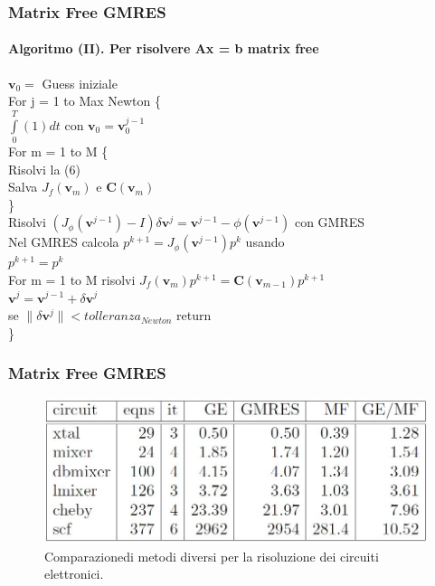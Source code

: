 \documentclass[10pt]{beamer}
\begin{document}
\begin{frame}
\frametitle{Matrix Free GMRES}\framesubtitle{\textbf{Algoritmo (II)}. Per risolvere Ax = b matrix free}
$\mathbf{v}_0 =$ Guess iniziale \\
 For j = 1 to Max Newton \{ \\
 $\int\limits_{0}^{T} (1) dt$ con $\mathbf{v}_0 = \mathbf{v}_0^{j-1}$ \\
 For m = 1 to M \{ \\
 Risolvi la (6) \\
 Salva $J_f(\mathbf{v}_m)$ e $\mathbf{C}(\mathbf{v}_m)$ \\
 \}\\
 Risolvi $(J_\phi(\mathbf{v}^{j-1}) - I)\delta\mathbf{v}^j = \mathbf{v}^{j-1} - \phi(\mathbf{v}^{j-1})$ con GMRES\\
 Nel GMRES calcola $p^{k+1} = J_\phi(\mathbf{v}^{j-1})p^k$ usando\\
 $p^{k+1} = p^k$ \\
 For m = 1 to M risolvi $J_f(\mathbf{v}_m)p^{k+1} = \mathbf{C}(\mathbf{v}_{m-1})p^{k+1}$ \\
 $\mathbf{v}^j = \mathbf{v}^{j-1} + \delta\mathbf{v}^j$ \\
 se $\|\delta\mathbf{v}^j\| < tolleranza_{Newton}$ return\\
 \}
\end{frame}


\begin{frame} \frametitle{Matrix Free GMRES}
\begin{figure}
    \centering
    \includegraphics[width=.75\linewidth]{Tabella1.JPG}
    \caption{Comparazione\footnotemark di metodi diversi per la risoluzione dei circuiti elettronici.}
\end{figure}
\end{frame}
\end{document}
